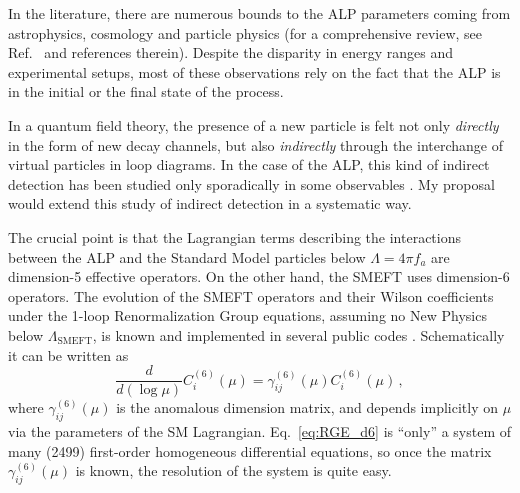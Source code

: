 \documentclass[combined.tex]{subfiles}
\begin{document}
In the literature, there are numerous bounds to the ALP parameters coming from astrophysics, cosmology \cite{Cadamuro:2011fd,Millea:2015qra,DiLuzio:2016sbl,Agrawal:2021dbo,Lucente:2021hbp} and particle physics \cite{Mimasu:2014nea,Jaeckel:2015jla,Bauer:2017ris,Brivio:2017ije,Alonso-Alvarez:2018irt,Baldenegro:2018hng,
Harland-Lang:2019zur,MartinCamalich:2020dfe,DiLuzio:2020oah,Guerrera:2021yss,Gallo:2021ame} (for a comprehensive review, see Ref.~\cite{Irastorza:2018dyq} 
and references therein). Despite the disparity in energy ranges and experimental setups, most of these observations rely on the fact that the ALP is in the initial or the final state of the process.

In a quantum field theory, the presence of a new particle is felt not only \textit{directly} in the form of new decay channels, but also \textit{indirectly} through the interchange of virtual particles in loop diagrams. In the case of the ALP, this kind of indirect detection has been studied only sporadically in some observables \cite{Bauer:2017nlg,Bauer:2017ris,Marciano:2016yhf,Bauer:2019gfk,Buen-Abad:2021fwq}. My proposal would extend this study of indirect detection in a systematic way.

The crucial point is that the Lagrangian terms describing the interactions between the ALP and the Standard Model particles below $\Lambda = 4\pi f_a$ are dimension-5 effective operators. On the other hand, the SMEFT uses dimension-6 operators. The evolution of the SMEFT operators and their Wilson coefficients under the 1-loop Renormalization Group equations, assuming no New Physics below $\Lambda_\mathrm{SMEFT}$, is known \cite{Jenkins:2013zja,Jenkins:2013wua,Alonso:2013hga,} and implemented in several public codes \cite{Celis:2017hod,Aebischer:2018bkb}. Schematically it can be written as
\begin{equation}
\frac{d}{d(\log \mu)}C^{(6)}_i(\mu) = \gamma^{(6)}_{ij}(\mu)C^{(6)}_i(\mu)\,,\label{eq:RGE_d6}
\end{equation}
where $\gamma^{(6)}_{ij}(\mu)$ is the anomalous dimension matrix, and depends implicitly on $\mu$ via the parameters of the SM Lagrangian. Eq.~\eqref{eq:RGE_d6} is ``only'' a system of many (2499) first-order homogeneous differential equations, so once the matrix $\gamma^{(6)}_{ij}(\mu)$ is known, the resolution of the system is quite easy.
\end{document}
